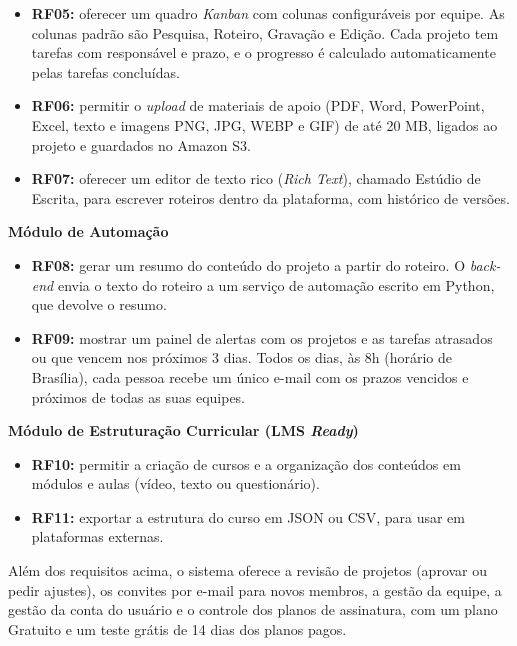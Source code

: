 \begin{itemize}
    \item \textbf{RF05:} oferecer um quadro \textit{Kanban} com colunas configuráveis por equipe. As colunas padrão são Pesquisa, Roteiro, Gravação e Edição. Cada projeto tem tarefas com responsável e prazo, e o progresso é calculado automaticamente pelas tarefas concluídas.
    \item \textbf{RF06:} permitir o \textit{upload} de materiais de apoio (PDF, Word, PowerPoint, Excel, texto e imagens PNG, JPG, WEBP e GIF) de até 20 MB, ligados ao projeto e guardados no Amazon S3.
    \item \textbf{RF07:} oferecer um editor de texto rico (\textit{Rich Text}), chamado Estúdio de Escrita, para escrever roteiros dentro da plataforma, com histórico de versões.
\end{itemize}

\textbf{Módulo de Automação}

\begin{itemize}
    \item \textbf{RF08:} gerar um resumo do conteúdo do projeto a partir do roteiro. O \textit{back-end} envia o texto do roteiro a um serviço de automação escrito em Python, que devolve o resumo.
    \item \textbf{RF09:} mostrar um painel de alertas com os projetos e as tarefas atrasados ou que vencem nos próximos 3 dias. Todos os dias, às 8h (horário de Brasília), cada pessoa recebe um único e-mail com os prazos vencidos e próximos de todas as suas equipes.
\end{itemize}

\textbf{Módulo de Estruturação Curricular (LMS \textit{Ready})}

\begin{itemize}
    \item \textbf{RF10:} permitir a criação de cursos e a organização dos conteúdos em módulos e aulas (vídeo, texto ou questionário).
    \item \textbf{RF11:} exportar a estrutura do curso em JSON ou CSV, para usar em plataformas externas.
\end{itemize}

Além dos requisitos acima, o sistema oferece a revisão de projetos (aprovar ou pedir ajustes), os convites por e-mail para novos membros, a gestão da equipe, a gestão da conta do usuário e o controle dos planos de assinatura, com um plano Gratuito e um teste grátis de 14 dias dos planos pagos.

